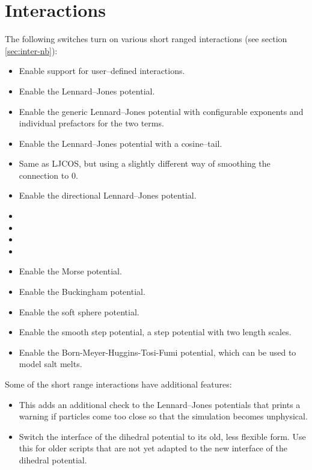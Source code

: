 \section{Interactions}

The following switches turn on various short ranged interactions (see section
\vref{sec:inter-nb}):
\begin{itemize}
\item {} Enable support for user--defined
  interactions.
\item {} Enable the Lennard--Jones potential.
\item {} Enable the generic
  Lennard--Jones potential with configurable exponents and individual
  prefactors for the two terms.
\item {} Enable the Lennard--Jones potential with a cosine--tail.
\item {} Same as LJCOS, but using a slightly different way of
  smoothing the connection to 0.
\item {} Enable the directional Lennard--Jones potential.
\item {}
\item {}
\item {}
\item {}
\item {} Enable the Morse potential.
\item {} Enable the Buckingham potential.
\item {} Enable the soft sphere potential.
\item {} Enable the smooth step potential, a
  step potential with two length scales.
\item {} Enable the Born-Meyer-Huggins-Tosi-Fumi potential,
  which can be used to model salt melts.
\end{itemize}

Some of the short range interactions have additional features:
\begin{itemize}
\item {} This adds an additional check to
  the Lennard--Jones potentials that prints a warning if particles come
  too close so that the simulation becomes unphysical.
\item {} Switch the interface of the dihedral potential
  to its old, less flexible form. Use this for older scripts that are not yet
  adapted to the new interface of the dihedral potential.
\end{itemize}

